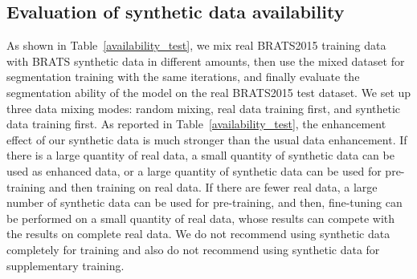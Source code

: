 \documentclass[runningheads]{llncs}
\begin{document}
	\subsection{Evaluation of synthetic data availability}
	As shown in Table~\ref{availability_test}, we mix real BRATS2015 training data with BRATS synthetic data in different amounts, then use the mixed dataset for segmentation training with the same iterations, and finally evaluate the segmentation ability of the model on the real BRATS2015 test dataset. We set up three data mixing modes: random mixing, real data training first, and synthetic data training first. As reported in Table~\ref{availability_test}, the enhancement effect of our synthetic data is much stronger than the usual data enhancement. If there is a large quantity of real data, a small quantity of synthetic data can be used as enhanced data, or a large quantity of synthetic data can be used for pre-training and then training on real data. If there are fewer real data, a large number of synthetic data can be used for pre-training, and then, fine-tuning can be performed on a small quantity of real data, whose results can compete with the results on complete real data.  We do not recommend using synthetic data completely for training and also do not recommend using synthetic data for supplementary training.
\end{document}
